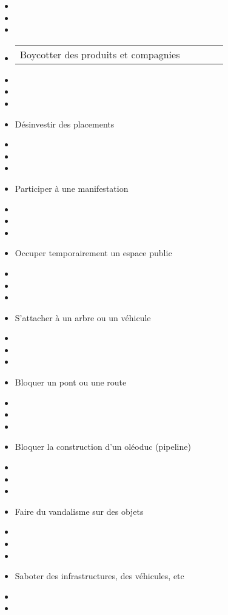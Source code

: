 \documentclass[
  letterpaper,
  DIV=11,
  numbers=noendperiod]{scrreprt}
\begin{document}
\begin{itemize}
\item
\item
\item
\item
  \begin{longtable}[]{@{}lllll@{}}
  \toprule\noalign{}
  \endhead
  \bottomrule\noalign{}
  \endlastfoot
  Boycotter des produits et compagnies & & & & \\
  \end{longtable}
\item
\item
\item
\item
  \hfill\break
  Désinvestir des placements \textbar{}
\item
\item
\item
\item
  \hfill\break
  Participer à une manifestation \textbar{}
\item
\item
\item
\item
  \hfill\break
  Occuper temporairement un espace public \textbar{}
\item
\item
\item
\item
  \hfill\break
  S'attacher à un arbre ou un véhicule \textbar{}
\item
\item
\item
\item
  \hfill\break
  Bloquer un pont ou une route \textbar{}
\item
\item
\item
\item
  \hfill\break
  Bloquer la construction d'un oléoduc (pipeline) \textbar{}
\item
\item
\item
\item
  \hfill\break
  Faire du vandalisme sur des objets \textbar{}
\item
\item
\item
\item
  \hfill\break
  Saboter des infrastructures, des véhicules, etc \textbar{}
\item
\item

\end{itemize}
\end{document}
